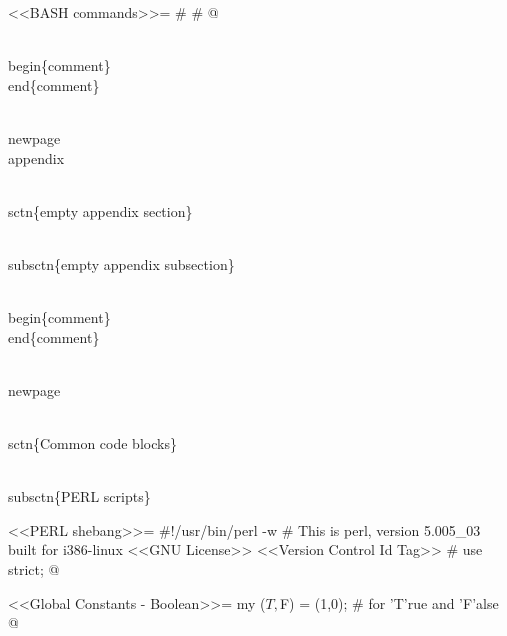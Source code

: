 \documentclass[11pt]{article}
\def\nwendcode{\endtrivlist \endgroup} %
\let\nwdocspar=\par                    %
\begin{document}
<<BASH commands>>=
#
#
@

\\begin\{comment\}
\\end\{comment\}

\nwendcode{}\nwdocspar

\nwenddocs{}\endmoddef

% 

\\newpage
\\appendix

\\sctn\{empty appendix section\}

\\subsctn\{empty appendix subsection\}

\\begin\{comment\}
\\end\{comment\}

\nwendcode{}\nwdocspar


\nwenddocs{}\endmoddef
\\newpage

\\sctn\{Common code blocks\}

\\subsctn\{PERL scripts\}

<<PERL shebang>>=
#!/usr/bin/perl -w
# This is perl, version 5.005_03 built for i386-linux
<<GNU License>>
<<Version Control Id Tag>>
#
use strict;
@

<<Global Constants - Boolean>>=
my ($T,$F) = (1,0); # for 'T'rue and 'F'alse
@ %
\end{document}
